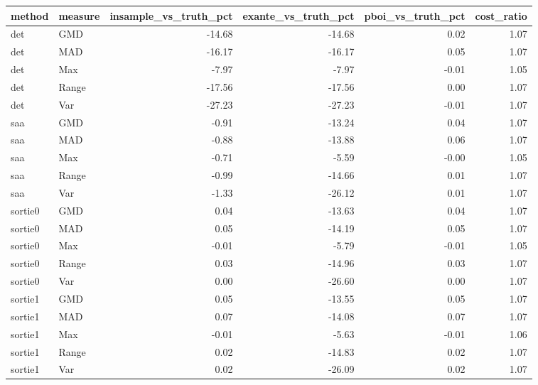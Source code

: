 \begin{tabular}{llrrrr}
\toprule
method & measure & insample_vs_truth_pct & exante_vs_truth_pct & pboi_vs_truth_pct & cost_ratio \\
\midrule
det & GMD & -14.68 & -14.68 & 0.02 & 1.07 \\
det & MAD & -16.17 & -16.17 & 0.05 & 1.07 \\
det & Max & -7.97 & -7.97 & -0.01 & 1.05 \\
det & Range & -17.56 & -17.56 & 0.00 & 1.07 \\
det & Var & -27.23 & -27.23 & -0.01 & 1.07 \\
saa & GMD & -0.91 & -13.24 & 0.04 & 1.07 \\
saa & MAD & -0.88 & -13.88 & 0.06 & 1.07 \\
saa & Max & -0.71 & -5.59 & -0.00 & 1.05 \\
saa & Range & -0.99 & -14.66 & 0.01 & 1.07 \\
saa & Var & -1.33 & -26.12 & 0.01 & 1.07 \\
sortie0 & GMD & 0.04 & -13.63 & 0.04 & 1.07 \\
sortie0 & MAD & 0.05 & -14.19 & 0.05 & 1.07 \\
sortie0 & Max & -0.01 & -5.79 & -0.01 & 1.05 \\
sortie0 & Range & 0.03 & -14.96 & 0.03 & 1.07 \\
sortie0 & Var & 0.00 & -26.60 & 0.00 & 1.07 \\
sortie1 & GMD & 0.05 & -13.55 & 0.05 & 1.07 \\
sortie1 & MAD & 0.07 & -14.08 & 0.07 & 1.07 \\
sortie1 & Max & -0.01 & -5.63 & -0.01 & 1.06 \\
sortie1 & Range & 0.02 & -14.83 & 0.02 & 1.07 \\
sortie1 & Var & 0.02 & -26.09 & 0.02 & 1.07 \\
\bottomrule
\end{tabular}
